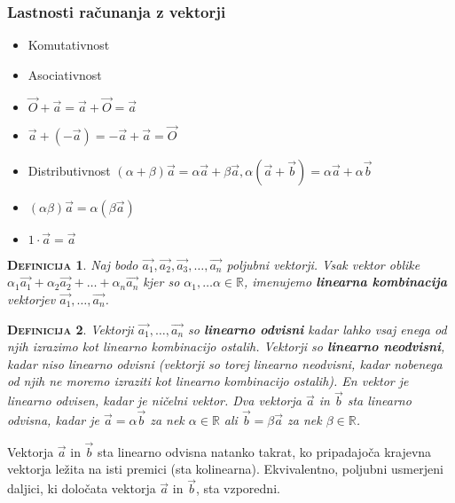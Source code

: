 \documentclass[a4paper,12pt]{article}
\newtheorem*{definicija}{\textsc{Definicija}}
\begin{document}
\begin{center}
\subsubsection{Lastnosti računanja z vektorji}
\end{center}

\begin{itemize}
\item Komutativnost
\item Asociativnost
\item $\vec{O} + \vec{a} = \vec{a} + \vec{O} = \vec{a}$
\item $\vec{a} + (-\vec{a}) = -\vec{a} + \vec{a} = \vec{O}$
\item Distributivnost $(\alpha + \beta)\vec{a} = \alpha \vec{a} + \beta \vec{a}, \alpha (\vec{a} + \vec{b}) = \alpha \vec{a} + \alpha \vec{b}$
\item $(\alpha \beta ) \vec{a} = \alpha ( \beta \vec{a})$
\item  $ 1 \cdot \vec{a} = \vec{a}$\\
\end{itemize}

\begin{definicija}
Naj bodo $\vec{a_1}, \vec{a_2}, \vec{a_3}, \ldots , \vec{a_n}$ poljubni vektorji. Vsak vektor oblike \linebreak  $\alpha_1 \vec{a_1} + \alpha_2 \vec{a_2} + \ldots + \alpha_n \vec{a_n}$ kjer so $ \alpha_1, \ldots \alpha \in \mathbb{R} $, imenujemo \textbf{linearna kombinacija} vektorjev $\vec{a_1}, \ldots , \vec{a_n}$.\\
\end{definicija}

\begin{definicija}
Vektorji $\vec{a_1}, \ldots , \vec{a_n}$ so \textbf{linearno odvisni} kadar lahko vsaj enega od njih izrazimo kot linearno kombinacijo ostalih. Vektorji so \textbf{linearno neodvisni}, kadar niso linearno odvisni (vektorji so torej linearno neodvisni, kadar nobenega od njih ne moremo izraziti kot linearno kombinacijo ostalih). En vektor je linearno odvisen, kadar je ničelni vektor. Dva vektorja $\vec{a}$ in $\vec{b}$ sta linearno odvisna, kadar je $ \vec{a} = \alpha \vec{b}$ za nek $\alpha \in \mathbb{R}$ ali $\vec{b} = \beta \vec{a}$ za nek $\beta \in \mathbb{R}$. \\
\end{definicija}

Vektorja $\vec{a}$ in $\vec{b}$ sta linearno odvisna natanko takrat, ko pripadajoča krajevna vektorja ležita na isti premici (sta kolinearna). Ekvivalentno, poljubni usmerjeni daljici, ki določata vektorja $\vec{a}$ in $ \vec{b}$, sta vzporedni. \\
\end{document}
